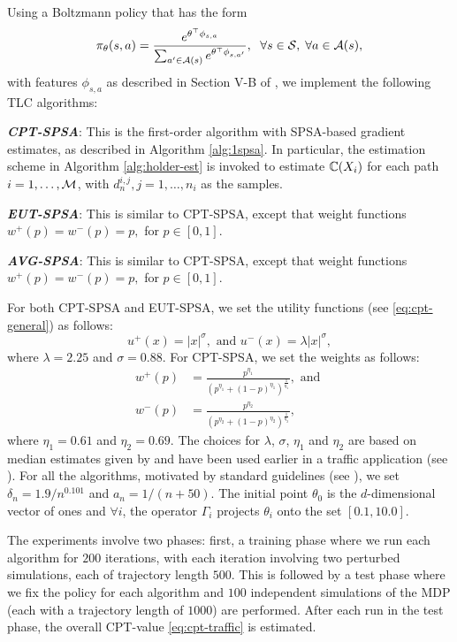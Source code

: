 Using a Boltzmann policy that has the form
$$
\pi_{\theta}(s,a) = \frac{e^{\theta^{\top} \phi_{s,a}}}{\sum_{a' \in {\mathcal{A}(s)}} e^{\theta^{\top} \phi_{s,a'}}},
\hspace{6pt} \forall s \in \mathcal{S},\;\forall a \in \mathcal{A}(s),
$$
with features $\phi_{s,a}$ as described in Section V-B of \cite{prashanth2012threshold},
we implement the following TLC algorithms:

{\bf\em CPT-SPSA}: This is the first-order algorithm with SPSA-based gradient estimates, as described in Algorithm \ref{alg:1spsa}. In particular, the estimation scheme in Algorithm \ref{alg:holder-est} is invoked to estimate $\mathbb{C}(X_i)$ for each path $i=1,\ldots,\mathcal{M}$, with $d_n^{i,j}, j=1,\ldots,n_i$ as the samples.

{\bf\em EUT-SPSA}: This is similar to CPT-SPSA, except that weight functions $w^+(p)=w^-(p)=p,$ for $p\in [0,1]$. 

{\bf\em AVG-SPSA}: This is similar to CPT-SPSA, except that weight functions $w^+(p)=w^-(p)=p,$ for $p\in [0,1]$. 

For both CPT-SPSA and EUT-SPSA, we set the utility functions (see \eqref{eq:cpt-general}) as follows:
$$u^+(x) =  |x|^{\sigma}, \text{ and  }u^-(x) = \lambda |x|^{\sigma},$$ 
where $\lambda = 2.25$ and $\sigma = 0.88$.
For CPT-SPSA, we set the weights as follows:
\begin{align*}
w^+(p) &= \frac{p^{\eta_1}}{{(p^{\eta_1}+ (1-p)^{\eta_1})}^{\frac{1}{\eta_1}}}, \text{ and }\\  
w^-(p) &= \frac{p^{\eta_2}}{{(p^{\eta_2}+ (1-p)^{\eta_2})}^{\frac{1}{\eta_2}}},
\end{align*} 
where $\eta_1 = 0.61$ and $\eta_2 = 0.69$. The choices for $\lambda$, $\sigma$, $\eta_1$ and $\eta_2$ are based on median estimates given by \cite{tversky1992advances} and have been used earlier in a traffic application (see \cite{gao2010adaptive}).
For all the algorithms,
 motivated by standard guidelines (see \cite{spall2005introduction}),
 we set $\delta_n = 1.9/n^{0.101}$ and $a_n = 1/(n+50)$. The initial point $\theta_0$ is the $d$-dimensional vector of ones and $\forall i$, the operator $\Gamma_i$ projects $\theta_i$ onto the set $[0.1, 10.0]$.
    
The experiments involve two phases:
first, a training phase where we run each algorithm for $200$ iterations, with each iteration involving two perturbed simulations, each of trajectory length $500$. This is followed by a test phase where we fix the policy for each algorithm and $100$ independent simulations of the MDP (each with a trajectory length of $1000$) are performed. After each run in the test phase, the overall CPT-value \eqref{eq:cpt-traffic} is estimated. 

